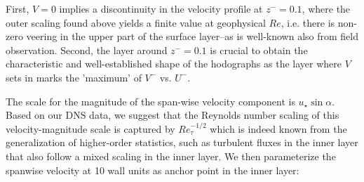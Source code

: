 \documentclass[a4paper,11pt]{amsart}
\begin{document}
First, $V=0$  implies a discontinuity in the velocity profile at $z^-=0.1$, where the outer scaling found above 
yields a finite value at geophysical $Re$, i.e. there is non-zero veering in the upper part of the
surface layer--as is well-known also from field observation. 
%
Second, the layer around $z^-=0.1$ is crucial to obtain the characteristic and well-established shape of the hodographs as the layer
where $V$ sets in marks the 'maximum' of $V^-$ vs. $U^-$.
%
%
\par
%
The scale for the magnitude of the span-wise velocity component is $u_\star\sin\alpha$. 
%
Based on our DNS data, we suggest that the Reynolds number scaling of this velocity-magnitude scale is captured
by $Re_\tau^{-1/2}$ which is indeed known from the generalization of higher-order statistics, such as turbulent fluxes
in the inner layer \citep{marusic:JFM2013} that also follow a mixed scaling in the inner layer.
%
We then parameterize the spanwise velocity at 10 wall units as anchor point in the inner layer:
\end{document}
